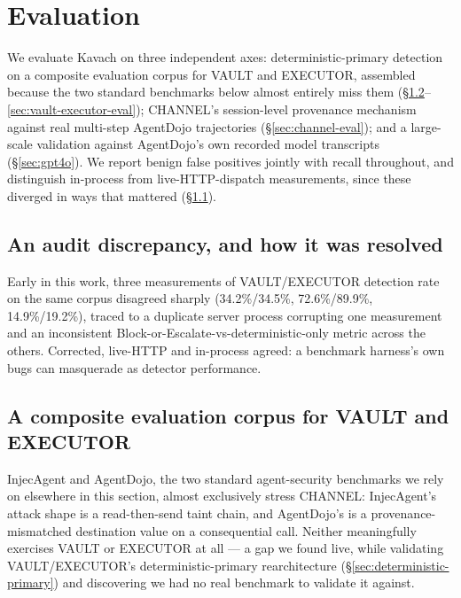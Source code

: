 
\section{Evaluation}
\label{sec:eval}

We evaluate Kavach on three independent axes: deterministic-primary
detection on a composite evaluation corpus for VAULT and EXECUTOR,
assembled because the two standard benchmarks below almost entirely miss
them (\S\ref{sec:kavach-pb}--\ref{sec:vault-executor-eval}); CHANNEL's
session-level provenance mechanism against real multi-step AgentDojo
trajectories (\S\ref{sec:channel-eval}); and a large-scale validation
against AgentDojo's own recorded model transcripts
(\S\ref{sec:gpt4o}). We report benign false positives jointly with recall
throughout, and distinguish in-process from live-HTTP-dispatch
measurements, since these diverged in ways that mattered
(\S\ref{sec:audit-resolution}).

\subsection{An audit discrepancy, and how it was resolved}
\label{sec:audit-resolution}
Early in this work, three measurements of VAULT/EXECUTOR detection rate
on the same corpus disagreed sharply (34.2\%/34.5\%, 72.6\%/89.9\%,
14.9\%/19.2\%), traced to a duplicate server process corrupting one
measurement and an inconsistent Block-or-Escalate-vs-deterministic-only
metric across the others. Corrected, live-HTTP and in-process agreed: a
benchmark harness's own bugs can masquerade as detector performance.

\subsection{A composite evaluation corpus for VAULT and EXECUTOR}
\label{sec:kavach-pb}
InjecAgent and AgentDojo, the two standard agent-security benchmarks we rely
on elsewhere in this section, almost exclusively stress CHANNEL: InjecAgent's
attack shape is a read-then-send taint chain, and AgentDojo's is a
provenance-mismatched destination value on a consequential call. Neither
meaningfully exercises VAULT or EXECUTOR at all --- a gap we found live,
while validating VAULT/EXECUTOR's deterministic-primary rearchitecture
(\S\ref{sec:deterministic-primary}) and discovering we had no real benchmark
to validate it against.

